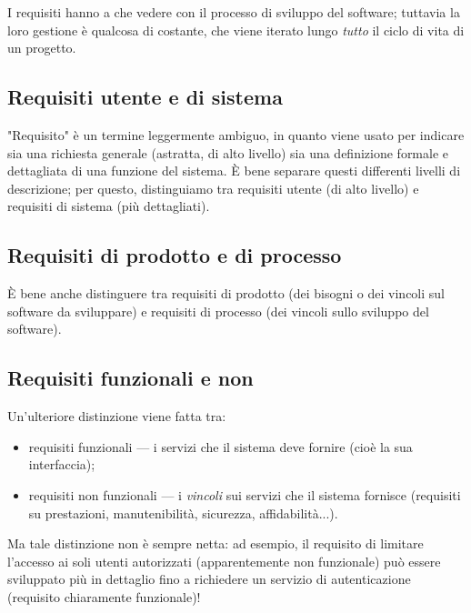 \documentclass[a4paper]{article}
\begin{document}
		
I requisiti hanno a che vedere con il processo di sviluppo del software; tuttavia la loro gestione è qualcosa di costante, che viene iterato lungo \emph{tutto} il ciclo di vita di un progetto.

		
	\subsection{Requisiti utente e di sistema}

		
"Requisito" è un termine leggermente ambiguo, in quanto viene usato per indicare sia una richiesta generale (astratta, di alto livello) sia una definizione formale e dettagliata di una funzione del sistema. È bene separare questi differenti livelli di descrizione; per questo, distinguiamo tra requisiti utente (di alto livello) e requisiti di sistema (più dettagliati).

		
	\subsection{Requisiti di prodotto e di processo}

		
È bene anche distinguere tra requisiti di prodotto (dei bisogni o dei vincoli sul software da sviluppare) e requisiti di processo (dei vincoli sullo sviluppo del software).

		
	\subsection{Requisiti funzionali e non}

		
Un'ulteriore distinzione viene fatta tra:
		
	\begin{itemize}
		
			
	\item requisiti funzionali — i servizi che il sistema deve fornire (cioè la sua interfaccia);
			
	\item requisiti non funzionali — i \emph{vincoli} sui servizi che il sistema fornisce (requisiti su prestazioni, manutenibilità, sicurezza, affidabilità...).
		
	\end{itemize}

		
Ma tale distinzione non è sempre netta: ad esempio, il requisito di limitare l'accesso ai soli utenti autorizzati (apparentemente non funzionale) può essere sviluppato più in dettaglio fino a richiedere un servizio di autenticazione (requisito chiaramente funzionale)!
\end{document}
